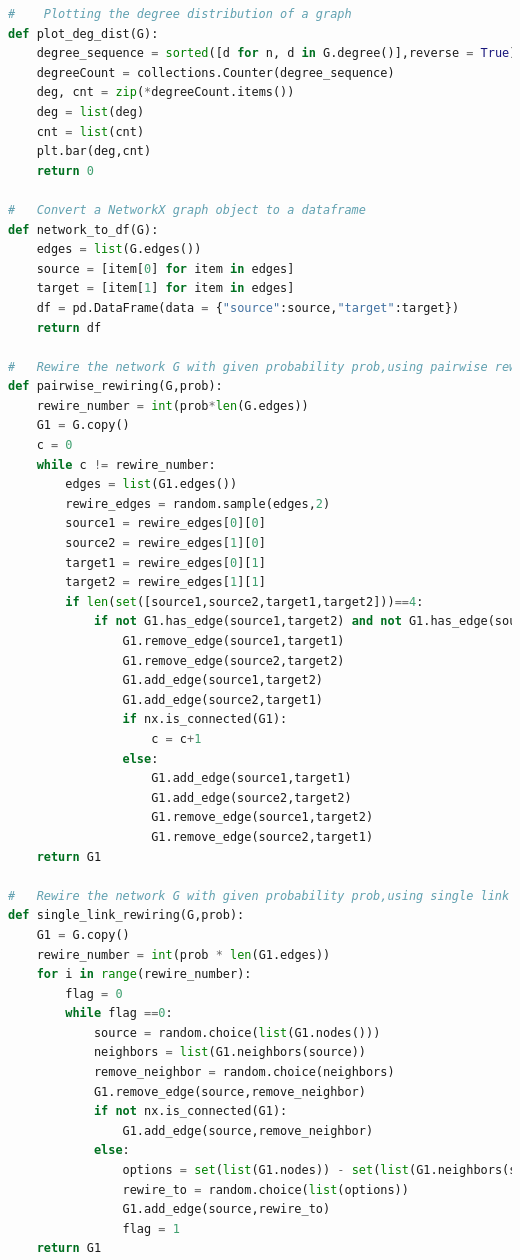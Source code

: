 \documentclass[12pt]{article}
\begin{document}
\begin{lstlisting}[language=Python,breaklines=true]
#    Plotting the degree distribution of a graph
def plot_deg_dist(G):
    degree_sequence = sorted([d for n, d in G.degree()],reverse = True)
    degreeCount = collections.Counter(degree_sequence)
    deg, cnt = zip(*degreeCount.items())
    deg = list(deg)
    cnt = list(cnt)
    plt.bar(deg,cnt)
    return 0

#   Convert a NetworkX graph object to a dataframe
def network_to_df(G):
    edges = list(G.edges())
    source = [item[0] for item in edges]
    target = [item[1] for item in edges]
    df = pd.DataFrame(data = {"source":source,"target":target})
    return df

#   Rewire the network G with given probability prob,using pairwise rewiring
def pairwise_rewiring(G,prob):
    rewire_number = int(prob*len(G.edges))
    G1 = G.copy()
    c = 0 
    while c != rewire_number:
        edges = list(G1.edges())
        rewire_edges = random.sample(edges,2)
        source1 = rewire_edges[0][0]
        source2 = rewire_edges[1][0]
        target1 = rewire_edges[0][1]
        target2 = rewire_edges[1][1]
        if len(set([source1,source2,target1,target2]))==4:
            if not G1.has_edge(source1,target2) and not G1.has_edge(source2,target1):
                G1.remove_edge(source1,target1)
                G1.remove_edge(source2,target2)
                G1.add_edge(source1,target2)
                G1.add_edge(source2,target1)
                if nx.is_connected(G1):
                    c = c+1
                else:
                    G1.add_edge(source1,target1)
                    G1.add_edge(source2,target2)
                    G1.remove_edge(source1,target2)
                    G1.remove_edge(source2,target1)
    return G1

#   Rewire the network G with given probability prob,using single link rewiring
def single_link_rewiring(G,prob):
    G1 = G.copy()
    rewire_number = int(prob * len(G1.edges))
    for i in range(rewire_number):
        flag = 0
        while flag ==0:
            source = random.choice(list(G1.nodes()))
            neighbors = list(G1.neighbors(source))
            remove_neighbor = random.choice(neighbors)
            G1.remove_edge(source,remove_neighbor)
            if not nx.is_connected(G1):
                G1.add_edge(source,remove_neighbor)
            else:
                options = set(list(G1.nodes)) - set(list(G1.neighbors(source)))-set([source,remove_neighbor])
                rewire_to = random.choice(list(options))
                G1.add_edge(source,rewire_to)
                flag = 1
    return G1


\end{lstlisting}
\end{document}
